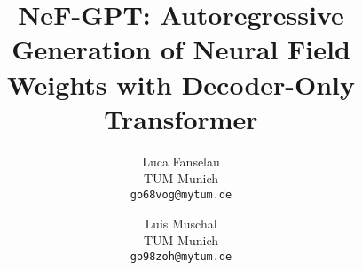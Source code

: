 \documentclass[10pt,twocolumn,letterpaper]{article}
\title{NeF-GPT: Autoregressive Generation of Neural Field Weights with Decoder-Only Transformer}
\author{Luca Fanselau\\
TUM Munich\\
{\tt\small go68vog@mytum.de}
\and
Luis Muschal\\
TUM Munich\\
{\tt\small go98zoh@mytum.de}
}
\begin{document}
\maketitle




\clearpage









% 



{
  \small
  
  
}

% 
\end{document}
